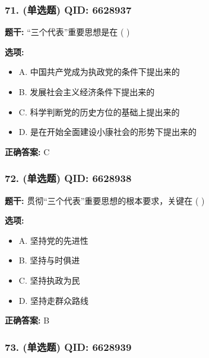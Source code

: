 \documentclass[12pt,UTF8]{ctexart}
\begin{document}
\subsubsection*{71. (单选题) \small QID: 6628937}

\textbf{题干:}
“三个代表”重要思想是在  ( )

\textbf{选项:}
\begin{itemize}[leftmargin=*]

  \item A. 中国共产党成为执政党的条件下提出来的

  \item B. 发展社会主义经济条件下提出来的

  \item C. 科学判断党的历史方位的基础上提出来的

  \item D. 是在开始全面建设小康社会的形势下提出来的

\end{itemize}

\textbf{正确答案:}
C

\vspace{0.3em}\hrulefill\vspace{0.7em}

\subsubsection*{72. (单选题) \small QID: 6628938}

\textbf{题干:}
贯彻“三个代表”重要思想的根本要求，关键在  ( )

\textbf{选项:}
\begin{itemize}[leftmargin=*]

  \item A. 坚持党的先进性

  \item B. 坚持与时俱进

  \item C. 坚持执政为民

  \item D. 坚持走群众路线

\end{itemize}

\textbf{正确答案:}
B

\vspace{0.3em}\hrulefill\vspace{0.7em}

\subsubsection*{73. (单选题) \small QID: 6628939}
\end{document}
